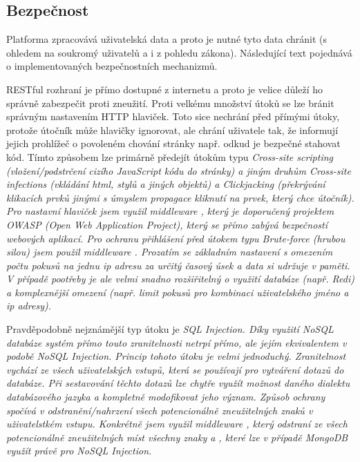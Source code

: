 \subsection{Bezpečnost}
Platforma zpracovává uživatelská data a proto je nutné tyto data chránit (s ohledem na soukromý uživatelů a i z pohledu zákona). Následující text pojednává o implementovaných bezpečnostních mechanizmů.

RESTful rozhraní je přímo dostupné z internetu a proto je velice důleží ho správně zabezpečit proti zneužití. Proti velkému množství útoků se lze bránit správným nastavením HTTP hlaviček. Toto sice nechrání před přímými útoky, protože útočník může hlavičky ignorovat, ale chrání uživatele tak, že informují jejich prohlížeč o povoleném chování stránky např. odkud je bezpečné stahovat kód. Tímto způsobem lze primárně předejít útokům typu \itshape{Cross-site scripting} (vložení/podstrčení cizího JavaScript kódu do stránky) a jiným druhům \itshape{Cross-site infections} (vkládání html, stylů a jiných objektů) a \itshape{Clickjacking} (překrývání klikacích prvků jinými s úmyslem propagace kliknutí na prvek, který chce útočník). Pro nastavní hlaviček jsem využil middleware , který je doporučený projektem OWASP (Open Web Application Project), který se přímo zabývá bezpečností webových aplikací. Pro ochranu přihlášení před útokem typu \itshape{Brute-force} (hrubou silou) jsem použil middleware . Prozatím se základním nastavení s omezením počtu pokusů na jednu ip adresu za určitý časový úsek a data si udržuje v paměti. V případě pootřeby je ale velmi snadno rozšiřitelný o využití databáze (např. Redi) a komplexnější omezení (např. limit pokusů pro kombinaci uživatelského jméno a ip adresy).

Pravděpodobně nejznámější typ útoku je \itshape{SQL Injection}. Díky využití NoSQL databáze systém přímo touto zranitelnosti netrpí přímo, ale jejím ekvivalentem v podobě \itshape{NoSQL Injection}. Princip tohoto útoku je velmi jednoduchý. Zranitelnost vychází ze všech uživatelských vstupů, která se používají pro vytváření dotazů do databáze. Při sestavování těchto dotazů lze chytře využít možnost daného dialektu databázového jazyka a kompletně modofikovat jeho význam. Způsob ochrany spočívá v odstranění/nahrzení všech potencionálně zneužitelných znaků v uživatelstkém vstupu. Konkrétně jsem využil middleware , který odstraní ze všech potencionálně zneužitelných míst všechny znaky \uv{\$} a , které lze v případě MongoDB využít právě pro \itshape{NoSQL Injection}.

